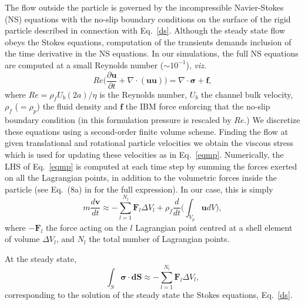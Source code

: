 The flow outside the particle is governed by the incompressible Navier-Stokes (NS) equations with the no-slip boundary conditions on the surface of the rigid particle described in connection with Eq.\ \eqref{ds}. Although the steady state flow obeys the Stokes equations, computation of the transients demands inclusion of the time derivative in the NS equations. In our simulations, the full NS equations are computed at a small Reynolds number ($\sim10^{-1}$), \textit{viz.}
\begin{equation}
    Re\bigg(\frac{\partial {\bm u}}{\partial t} + \nabla \cdot ({\bm u \bm u}) \bigg)=
    \nabla \cdot {\bm \sigma} + {\bm f},
    \label{NS}
\end{equation}
where $Re=\rho_f U_b (2a)/\eta$ is the Reynolds number, $U_b$ the channel bulk velocity, $\rho_f$ ($=\rho_p$) the fluid density and ${\bm f}$ the IBM force enforcing that the no-slip boundary condition (in this formulation pressure is rescaled by $Re$.) We discretize these equations using a second-order finite volume scheme. Finding the flow at given translational and rotational particle velocities we obtain the viscous stress which is used for updating these velocities as in Eq.\ \eqref{eqmp}. Numerically, the LHS of Eq.\ \eqref{eqmp} is computed at each time step by summing the forces exerted on all the Lagrangian points, in addition to the volumetric forces inside the particle (see Eq.\ (8a) in \cite{ibm} for the full expression). In our case, this is simply
\begin{equation}
     m\frac{d\bm v}{dt}  \approx
    -\sum_{l=1}^{N_l} {\bm F}_l \Delta V_l + \rho_f\frac{d}{dt}\bigg(\int_{V_p} {\bm u}dV \bigg),
    \label{ibm}
\end{equation}
where %
$-{\bm F}_l$ the force acting on the $l$ Lagrangian point  centred at a shell element of volume $\Delta V_l$, and $N_l$ the total number of Lagrangian points.

At the steady state,
\begin{equation}
    \int_{S}
   {\bm \sigma} \cdot \bm {dS}\approx -\sum_{l=1}^{N_l} {\bm F}_l \Delta V_l,
    \label{ibm 1}
\end{equation}
corresponding to the solution of the 
steady state the Stokes equations, Eq.\ \eqref{ds}. 

